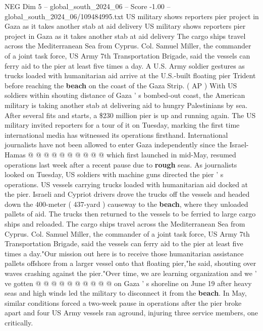 \begin{textsample}{NEG Dim 5 – global\_south\_2024\_06 – Score -1.00 – global\_south\_2024\_06/109484995.txt}  \label{ex:f5_neg_234}
US military shows reporters pier project in Gaza as it takes another stab at aid delivery US military shows reporters pier project in Gaza as it takes another stab at aid delivery The cargo ships travel across the Mediterranean Sea from Cyprus.
Col.
Samuel Miller, the commander of a joint task force, US Army 7th Transportation Brigade, said the vessels can ferry aid to the pier at least five times a day.
A U.S.
Army soldier gestures as trucks loaded with humanitarian aid arrive at the U.S.-built floating pier Trident before reaching the \textbf{beach} on the coast of the Gaza Strip. ( AP ) With US soldiers within shouting distance of Gaza ' s bombed-out coast, the American military is taking another stab at delivering aid to hungry Palestinians by sea.
After several fits and starts, a \$230 million pier is up and running again.
The US military invited reporters for a tour of it on Tuesday, marking the first time international media has witnessed its operations firsthand.
International journalists have not been allowed to enter Gaza independently since the Israel-Hamas @ @ @ @ @ @ @ @ @ @ which first launched in mid-May, resumed operations last week after a recent pause due to \textbf{rough} seas.
As journalists looked on Tuesday, US soldiers with machine guns directed the pier ' s operations.
US vessels carrying trucks loaded with humanitarian aid docked at the pier.
Israeli and Cypriot drivers drove the trucks off the vessels and headed down the 400-meter ( 437-yard ) causeway to the \textbf{beach}, where they unloaded pallets of aid.
The trucks then returned to the vessels to be ferried to large cargo ships and reloaded.
The cargo ships travel across the Mediterranean Sea from Cyprus.
Col.
Samuel Miller, the commander of a joint task force, US Army 7th Transportation Brigade, said the vessels can ferry aid to the pier at least five times a day."Our mission out here is to receive those humanitarian assistance pallets offshore from a larger vessel onto that floating pier,"he said, shouting over waves crashing against the pier."Over time, we are learning organization and we ' ve gotten @ @ @ @ @ @ @ @ @ @ on Gaza ' s shoreline on June 19 after heavy seas and high winds led the military to disconnect it from the \textbf{beach}.
In May, similar conditions forced a two-week pause in operations after the pier broke apart and four US Army vessels ran aground, injuring three service members, one critically.

\end{textsample}
